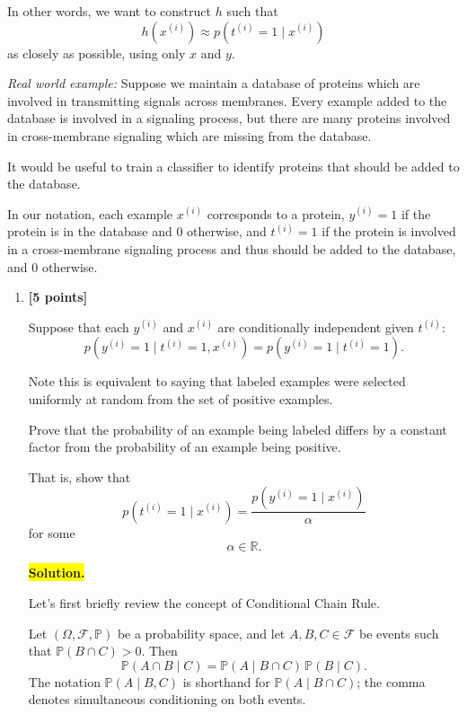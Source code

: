 \documentclass[10pt]{article}
\begin{document}
\begin{enumerate}
In other words, we want to construct $h$ such that
\[
h(x^{(i)})
\approx
p(t^{(i)}=1\mid x^{(i)})
\]
as closely as possible, using only $x$ and $y$.

\textit{Real world example:}
Suppose we maintain a database of proteins which are involved in
transmitting signals across membranes. Every example added to the
database is involved in a signaling process, but there are many
proteins involved in cross-membrane signaling which are missing from
the database.

It would be useful to train a classifier to identify proteins that
should be added to the database.

In our notation, each example $x^{(i)}$ corresponds to a protein,
$y^{(i)}=1$ if the protein is in the database and $0$ otherwise, and
$t^{(i)}=1$ if the protein is involved in a cross-membrane signaling
process and thus should be added to the database, and $0$ otherwise.

\begin{enumerate}[label=(\alph*)]


\item \textbf{[5 points]}

Suppose that each $y^{(i)}$ and $x^{(i)}$ are conditionally
independent given $t^{(i)}$:
\[
p(y^{(i)}=1\mid t^{(i)}=1,x^{(i)})
=
p(y^{(i)}=1\mid t^{(i)}=1).
\]

Note this is equivalent to saying that labeled examples were selected
uniformly at random from the set of positive examples.

Prove that the probability of an example being labeled differs by a
constant factor from the probability of an example being positive.

That is, show that
\[
p(t^{(i)}=1\mid x^{(i)})
=
\frac{
p(y^{(i)}=1\mid x^{(i)})
}{\alpha}
\]
for some
\[
\alpha\in\mathbb{R}.
\]


\medskip
\noindent\colorbox{yellow}{\textbf{Solution.}}

\vspace{3mm}

Let's first briefly review the concept of Conditional Chain Rule.

Let $(\Omega,\mathcal F,\mathbb P)$ be a probability space,
and let $A,B,C\in\mathcal F$ be events such that
$\mathbb P(B\cap C)>0$. Then
\[
\boxed{
\mathbb P(A\cap B\mid C)
=
\mathbb P(A\mid B\cap C)\,
\mathbb P(B\mid C).
}
\]
The notation $\mathbb P(A\mid B,C)$ is shorthand for
$\mathbb P(A\mid B\cap C)$; the comma denotes simultaneous
conditioning on both events.


\end{enumerate}
\end{enumerate}
\end{document}
